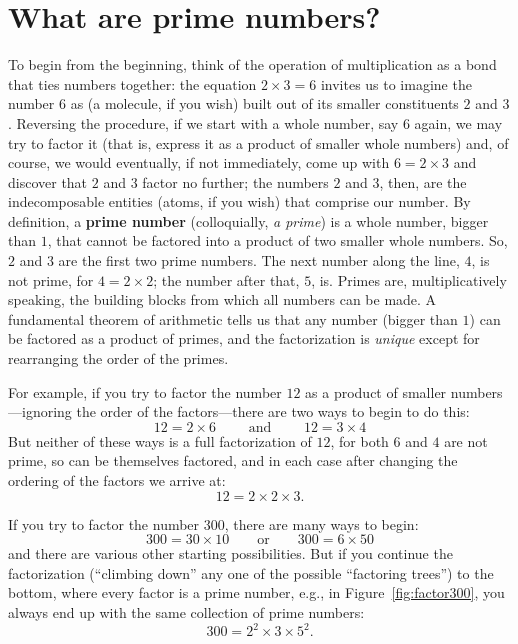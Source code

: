 \documentclass[11pt]{article}
\theoremstyle{plain}
\theoremstyle{definition}
\numberwithin{equation}{section}
\numberwithin{figure}{section}
\numberwithin{table}{section}
\begin{document}
            \bigskip
            
\section{What are prime numbers?}
            

 To begin from the beginning, think
of the operation of multiplication as a bond that ties numbers
together: the equation $2\times 3= 6$ invites us to imagine the number
$6$ as (a molecule, if you wish) built out of its smaller constituents
$2$ and $3$.  Reversing the procedure, if we start with a whole
number, say $6$ again, we may try to factor it (that is, express it as
a product of smaller whole numbers) and, of course, we would
eventually, if not immediately, come up with $6 = 2\times 3$ and
discover that $2$ and $3$ factor no further; the numbers $2$ and $3$,
then, are the indecomposable entities (atoms, if you wish) that
comprise our number.  By definition, a {\bf prime number}
(colloquially, {\em a prime}) is a whole number, bigger than $1$, that
cannot be factored into a product of two smaller whole numbers. So,
$2$ and $3$ are the first two prime numbers. The next number along the
line, $4$, is not prime, for $4= 2\times 2$; the number after that,
$5$, is. Primes are, multiplicatively speaking, the building blocks
from which all numbers can be made. A fundamental theorem of
arithmetic tells us that any number (bigger than $1$) can be factored
as a product of primes, and the factorization is {\em unique} except
for rearranging the order of the primes. 

For example, if you try to factor the number $12$ as a product of
smaller numbers---ignoring the order of the factors---there are two
ways to begin to do this:
$$
  12 = 2 \times 6 \qquad\text{ and }\qquad   12 = 3 \times 4
$$
But neither of these ways is a full factorization of $12$, for both
$6$ and $4$ are not prime, so can be themselves factored, and in each
case after changing the ordering of the factors we arrive at:
$$
   12= 2 \times 2 \times 3.
$$

If you try to factor the number $300$, there are many
ways to begin:
$$
  300= 30\times 10\qquad\text{or}\qquad 300 = 6 \times 50
$$
and there are various other starting possibilities. But if you continue the factorization (``climbing down'' any one of 
the possible ``factoring trees'') to the bottom, where every factor is a prime number, e.g., in
Figure~\ref{fig:factor300},
you always end up with the same collection of prime numbers:                  
                 $$300 = 2^2\times 3\times 5^2.$$   
\end{document}
